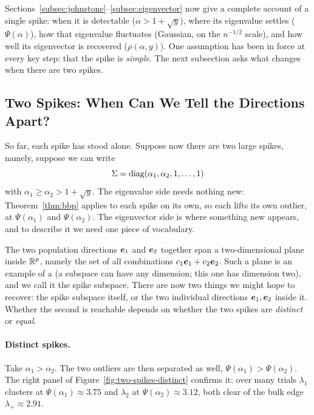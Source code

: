 Sections~\ref{subsec:johnstone}--\ref{subsec:eigenvector} now give a complete account of a single spike: when it is detectable (\(\alpha > 1 + \sqrt{y}\)), where its eigenvalue settles (\(\Psi(\alpha)\)), how that eigenvalue fluctuates (Gaussian, on the \(n^{-1/2}\) scale), and how well its eigenvector is recovered (\(\rho(\alpha, y)\)). One assumption has been in force at every key step: that the spike is \emph{simple}. The next subsection asks what changes when there are two spikes.

\subsection{Two Spikes: When Can We Tell the Directions Apart?}\label{subsec:two-spikes}

So far, each spike has stood alone. Suppose now there are two large spikes, namely, suppose we can write
\[
\Sigma = \operatorname{diag}(\alpha_1, \alpha_2, 1, \dots, 1)
\]
with \(\alpha_1 \ge \alpha_2 > 1 + \sqrt{y}\). The eigenvalue side needs nothing new: Theorem~\ref{thm:bbp} applies to each spike on its own, so each lifts its own outlier, at \(\Psi(\alpha_1)\) and \(\Psi(\alpha_2)\). The eigenvector side is where something new appears, and to describe it we need one piece of vocabulary.

The two population directions \(\bm{e}_1\) and \(\bm{e}_2\) together span a two-dimensional plane inside \(\mathbb{R}^p\), namely the set of all combinations \(c_1 \bm{e}_1 + c_2 \bm{e}_2\). Such a plane is an example of a  (a subspace can have any dimension; this one has dimension two), and we call it the spike subspace. There are now two things we might hope to recover: the spike subspace itself, or the two individual directions \(\bm{e}_1, \bm{e}_2\) inside it. Whether the second is reachable depends on whether the two spikes are \emph{distinct} or \emph{equal}.

\paragraph{Distinct spikes.}
Take \(\alpha_1 > \alpha_2\). The two outliers are then separated as well, \(\Psi(\alpha_1) > \Psi(\alpha_2)\). The right panel of Figure~\ref{fig:two-spikes-distinct} confirms it: over many trials \(\lambda_1\) clusters at \(\Psi(\alpha_1) \approx 3.75\) and \(\lambda_2\) at \(\Psi(\alpha_2) \approx 3.12\), both clear of the bulk edge \(\lambda_+ \approx 2.91\).

